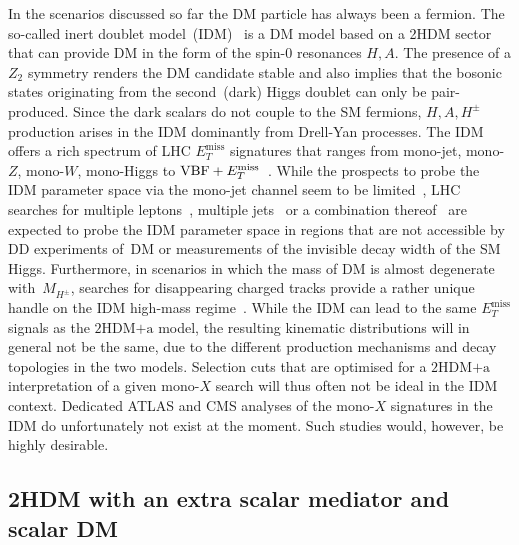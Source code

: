 \documentclass[review]{elsarticle}
\newcommand{\MET}{\ensuremath{E_T^\mathrm{miss}}\xspace}
\newcommand{\hdma}{\ensuremath{\textrm{2HDM+a}}\xspace}
\begin{document}
In the scenarios discussed so far the DM particle has always been a fermion. The so-called inert doublet model~(IDM)~\cite{Deshpande:1977rw,Barbieri:2006dq,Cao:2007rm} is a DM model based on a 2HDM sector that can provide DM in the form of the spin-0 resonances $H, A$.  The presence of a $Z_2$ symmetry renders the DM candidate stable and also implies  that the bosonic states originating from the second~(dark) Higgs doublet can only be pair-produced. Since the dark scalars do not couple to the SM fermions, $H,A,H^\pm$ production arises in the IDM dominantly from Drell-Yan processes. The IDM offers a rich spectrum of LHC $\MET$ signatures that ranges from mono-jet, mono-$Z$, mono-$W$, mono-Higgs to  ${\rm VBF}+\MET$~\cite{Dolle:2009ft,Miao:2010rg,Gustafsson:2012aj,Belanger:2015kga,Ilnicka:2015jba,Poulose:2016lvz,Datta:2016nfz,Hashemi:2016wup,deFlorian:2016spz,Belyaev:2016lok,Dutta:2017lny,Wan:2018eaz}.  While the prospects to probe the IDM parameter space via the mono-jet channel seem to be limited~\cite{Belyaev:2016lok}, LHC searches for multiple leptons~\cite{Dolle:2009ft,Miao:2010rg,Gustafsson:2012aj,Belanger:2015kga,Datta:2016nfz,Hashemi:2016wup}, multiple jets~\cite{Poulose:2016lvz,Dutta:2017lny}  or a combination thereof~\cite{Hashemi:2016wup,Wan:2018eaz} are expected to probe the IDM parameter space in regions that are not accessible by DD experiments of~DM or measurements of the invisible decay width of the SM Higgs. Furthermore, in scenarios in which the mass of DM is almost degenerate with~$M_{H^\pm}$, searches for disappearing charged tracks provide a rather unique handle on the IDM high-mass regime~\cite{Belyaev:2016lok}. While the IDM can lead to the same $\MET$ signals  as the \hdma model, the resulting kinematic distributions will in general not be the same, due to the different production mechanisms and decay topologies in the two models. Selection cuts that are optimised for a \hdma interpretation of a given mono-$X$ search will thus often not be ideal in the IDM context. Dedicated ATLAS and CMS  analyses of the mono-$X$ signatures in the IDM do unfortunately not exist at the moment. Such studies would, however, be highly desirable.

\subsection{2HDM with an extra scalar mediator and scalar DM}
\end{document}
